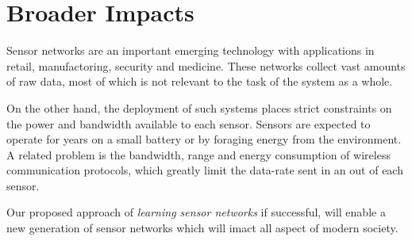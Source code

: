 \section{Broader Impacts}
Sensor networks are an important emerging technology with applications
in retail, manufactoring, security and medicine. These networks
collect vast amounts of raw data, most of which is not relevant to the
task of the system as a whole.

On the other hand, the deployment of such systems places strict
constraints on the power and bandwidth available to each sensor.
Sensors are expected to operate for years on a small battery or by
foraging energy from the environment. A related problem is the
bandwidth, range and energy consumption of wireless communication
protocols, which greatly limit the data-rate sent in an out of each
sensor.
 
Our proposed approach of {\em learning sensor networks} if successful,
will enable a new generation of sensor networks which will imact all
aspect of modern society.



